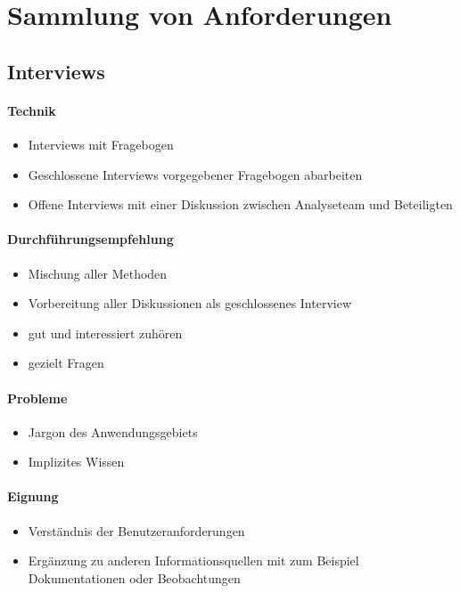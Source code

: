 
\section{Sammlung von Anforderungen}

\subsection{Interviews}
\paragraph{Technik}
\begin{itemize}
\item Interviews mit Fragebogen
\item Geschlossene Interviews vorgegebener Fragebogen abarbeiten
\item Offene Interviews mit einer Diskussion zwischen Analyseteam und Beteiligten
\end{itemize}

\paragraph{Durchführungsempfehlung}
\begin{itemize}
\item Mischung aller Methoden 
\item Vorbereitung aller Diskussionen als geschlossenes Interview 
\item gut und interessiert zuhören
\item gezielt Fragen
\end{itemize}

\paragraph{Probleme}
\begin{itemize}
\item Jargon des Anwendungsgebiets 
\item Implizites Wissen
\end{itemize}

\paragraph{Eignung}
\begin{itemize}
\item Verständnis der Benutzeranforderungen 
\item Ergänzung zu anderen Informationsquellen mit zum Beispiel Dokumentationen oder Beobachtungen
\end{itemize}

